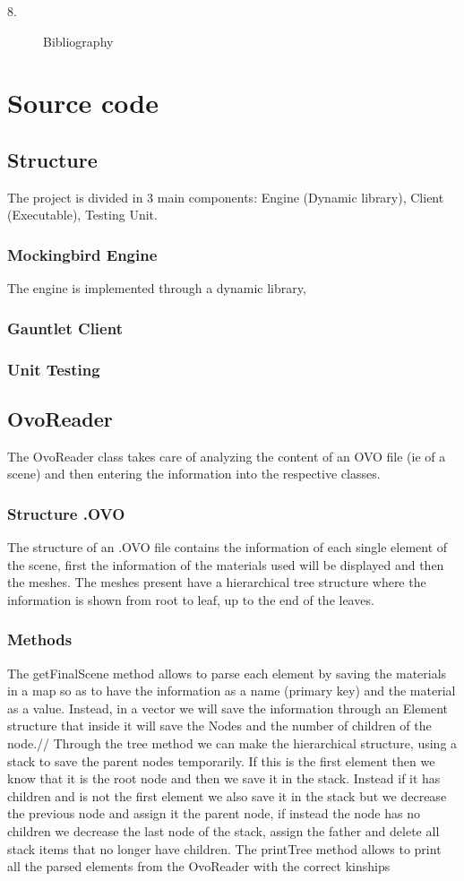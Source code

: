 \documentclass[a4paper]{article}
\begin{document}
\begin{description}
  \item [8.] Bibliography
\end{description}

\pagebreak

\section{Source code}
\subsection{Structure}
The project is divided in 3 main components: Engine (Dynamic library), Client (Executable), Testing Unit.
\subsubsection{Mockingbird Engine}
The engine is implemented through a dynamic library,  
\subsubsection{Gauntlet Client}
\subsubsection{Unit Testing}

\subsection{OvoReader}
The OvoReader class takes care of analyzing the content of an OVO file (ie of a scene) and then entering the information into the respective classes.
\subsubsection{Structure .OVO}
The structure of an .OVO file contains the information of each single element of the scene, first the information of the materials used will be displayed and then the meshes. The meshes present have a hierarchical tree structure where the information is shown from root to leaf, up to the end of the leaves.
\subsubsection{Methods}
The getFinalScene method allows to parse each element by saving the materials in a map so as to have the information as a name (primary key) and the material as a value. Instead, in a vector we will save the information through an Element structure that inside it will save the Nodes and the number of children of the node.//
Through the tree method we can make the hierarchical structure, using a stack to save the parent nodes temporarily. If this is the first element then we know that it is the root node and then we save it in the stack. Instead if it has children and is not the first element we also save it in the stack but we decrease the previous node and assign it the parent node, if instead the node has no children we decrease the last node of the stack, assign the father and delete all stack items that no longer have children.
The printTree method allows to print all the parsed elements from the OvoReader with the correct kinships
\end{document}
